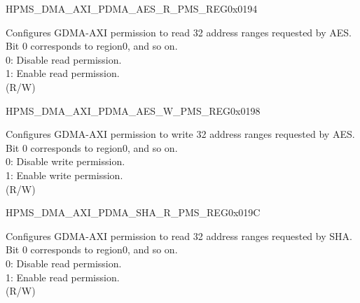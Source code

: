 \begin{register}{H}{PMS\_DMA\_AXI\_PDMA\_AES\_R\_PMS\_REG}{0x0194}\label{regdesc:PMSDMAAXIPDMAAESRPMSREG}
%
\regnewline%
\begin{regdesc}\begin{reglist}
\label{fielddesc:PMSDMAAXIPDMAAESRPMS}\item [PMS\_DMA\_AXI\_PDMA\_AES\_R\_PMS] Configures GDMA-AXI permission to read 32 address ranges requested by AES. Bit 0 corresponds to region0, and so on.\\
0: Disable read permission.\\
1: Enable read permission.\\ (R/W)
\end{reglist}\end{regdesc}
\end{register}


\begin{register}{H}{PMS\_DMA\_AXI\_PDMA\_AES\_W\_PMS\_REG}{0x0198}\label{regdesc:PMSDMAAXIPDMAAESWPMSREG}
%
\regnewline%
\begin{regdesc}\begin{reglist}
\label{fielddesc:PMSDMAAXIPDMAAESWPMS}\item [PMS\_DMA\_AXI\_PDMA\_AES\_W\_PMS] Configures GDMA-AXI permission to write 32 address ranges requested by AES. Bit 0 corresponds to region0, and so on.\\
0: Disable write permission.\\
1: Enable write permission.\\ (R/W)
\end{reglist}\end{regdesc}
\end{register}


\begin{register}{H}{PMS\_DMA\_AXI\_PDMA\_SHA\_R\_PMS\_REG}{0x019C}\label{regdesc:PMSDMAAXIPDMASHARPMSREG}
%
\regnewline%
\begin{regdesc}\begin{reglist}
\label{fielddesc:PMSDMAAXIPDMASHARPMS}\item [PMS\_DMA\_AXI\_PDMA\_SHA\_R\_PMS] Configures GDMA-AXI permission to read 32 address ranges requested by SHA. Bit 0 corresponds to region0, and so on.\\
0: Disable read permission.\\
1: Enable read permission.\\ (R/W)
\end{reglist}\end{regdesc}
\end{register}



